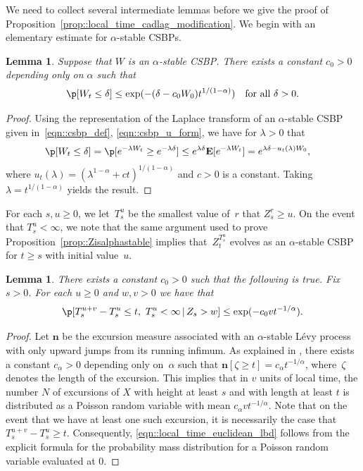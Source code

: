 \documentclass[10pt]{amsart}
\theoremstyle{plain}
\numberwithin{theorem}{section}
\newtheorem{lemma}[theorem]{Lemma}
\theoremstyle{definition}
\newcommand \E {{\mathbf E}}
\newcommand{\giv}{\,|\,}
\begin{document}
We need to collect several intermediate lemmas before we give the proof of Proposition~\ref{prop::local_time_cadlag_modification}. We begin with an elementary estimate for $\alpha$-stable CSBPs.

\begin{lemma}
\label{lem::csbp_terminal_value}
Suppose that $W$ is an $\alpha$-stable CSBP. There exists a constant $c_0 > 0$ depending only on $\alpha$ such that
\[
\p[ W_t \leq \delta] \leq \exp( -(\delta- c_0 W_0) t^{1/(1-\alpha)}) \quad\text{for all } \delta > 0.
\]
\end{lemma}
\begin{proof}
Using the representation of the Laplace transform of an $\alpha$-stable CSBP given in~\eqref{eqn::csbp_def}, \eqref{eqn::csbp_u_form}, we have for $\lambda > 0$ that
\begin{align*}
\p[ W_t \leq \delta]
&= \p[ e^{-\lambda W_t} \geq e^{-\lambda \delta}]
\leq e^{\lambda \delta} \E[ e^{-\lambda W_t}]
= e^{\lambda \delta - u_t(\lambda) W_0},
\end{align*}
where $u_t(\lambda) = (\lambda^{1-\alpha} + c t)^{1/(1-\alpha)}$ and $c > 0$ is a constant. Taking $\lambda = t^{1/(1-\alpha)}$ yields the result.
\end{proof}

For each $s,u \geq 0$, we let~$T_s^u$ be the smallest value of~$r$ that $Z_s^r \geq u$. On the event that $T_s^u < \infty$, we note that the same argument used to prove Proposition~\ref{prop::Zisalphastable} implies that~$Z_t^{T_s^u}$ evolves as an $\alpha$-stable CSBP for $t \geq s$ with initial value~$u$.

\begin{lemma}
\label{lem::length_lbd}
There exists a constant $c_0 > 0$ such that the following is true. Fix $s > 0$. For each $u \geq 0$ and $w,v > 0$ we have that
\begin{equation}
\label{eqn::local_time_euclidean_lbd}
\p[ T_s^{u+v} - T_s^u \leq t,\ T_s^u < \infty \giv Z_s > w] \leq \exp(-c_0 v t^{-1/\alpha}).
\end{equation}
\end{lemma}
\begin{proof}
Let ${\mathbf n}$ be the excursion measure associated with an $\alpha$-stable Lévy process with only upward jumps from its running infimum. As explained in \cite[Chap.\,VIII.4]{bertoinlevybook}, there exists a constant $c_\alpha > 0$ depending only on~$\alpha$ such that ${\mathbf n}[ \zeta \geq t] = c_\alpha t^{-1/\alpha}$, where~$\zeta$ denotes the length of the excursion. This implies that in $v$ units of local time, the number $N$ of excursions of $X$ with height at least $s$ and with length at least $t$ is distributed as a Poisson random variable with mean $c_\alpha v t^{-1/\alpha}$. Note that on the event that we have at least one such excursion, it is necessarily the case that $T_s^{u+v} - T_s^u \geq t$. Consequently, \eqref{eqn::local_time_euclidean_lbd} follows from the explicit formula for the probability mass distribution for a Poisson random variable evaluated at $0$.
\end{proof}
\end{document}
